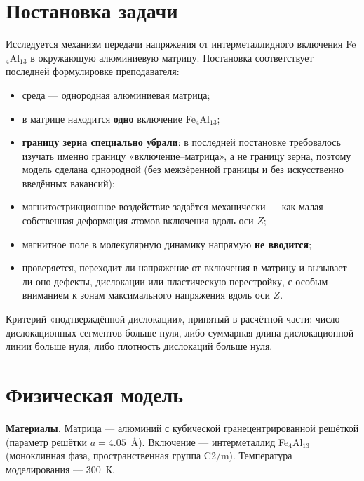 \documentclass[12pt,a4paper]{extarticle}
\begin{document}
\section{Постановка задачи}
Исследуется механизм передачи напряжения от интерметаллидного включения Fe$_4$Al$_{13}$ в окружающую алюминиевую матрицу. Постановка соответствует последней формулировке преподавателя:
\begin{itemize}[leftmargin=1.4em,itemsep=2pt,topsep=2pt]
\item среда — однородная алюминиевая матрица;
\item в матрице находится \textbf{одно} включение Fe$_4$Al$_{13}$;
\item \textbf{границу зерна специально убрали}: в последней постановке требовалось изучать именно границу «включение--матрица», а не границу зерна, поэтому модель сделана однородной (без межзёренной границы и без искусственно введённых вакансий);
\item магнитострикционное воздействие задаётся механически — как малая собственная деформация атомов включения вдоль оси $Z$;
\item магнитное поле в молекулярную динамику напрямую \textbf{не вводится};
\item проверяется, переходит ли напряжение от включения в матрицу и вызывает ли оно дефекты, дислокации или пластическую перестройку, с особым вниманием к зонам максимального напряжения вдоль оси $Z$.
\end{itemize}
Критерий «подтверждённой дислокации», принятый в расчётной части: число дислокационных сегментов больше нуля, либо суммарная длина дислокационной линии больше нуля, либо плотность дислокаций больше нуля.

\section{Физическая модель}
\noindent\textbf{Материалы.} Матрица — алюминий с кубической гранецентрированной решёткой (параметр решётки $a = 4.05$~Å). Включение — интерметаллид Fe$_4$Al$_{13}$ (моноклинная фаза, пространственная группа C2/m). Температура моделирования — 300~К.
\end{document}
